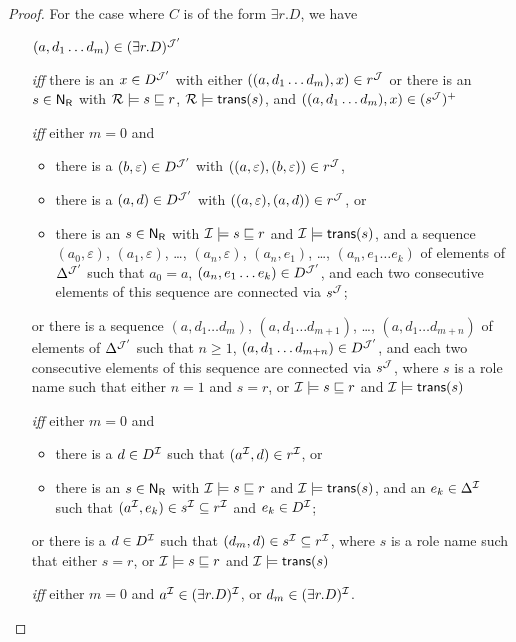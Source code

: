 \begin{proof}
    \noindent
    For the case where $C$ is of the form $\exists r.D$, we have
    \begin{itemize}
        \item[]
            $(a,d_1\dots d_m)\in(\exists r.D)^{\mathcal{J}'}$
        \item[\emph{iff}]
            there is an $x\in D^{\mathcal{J}'}$ with either $((a,d_1\dots d_m),x)\in
            r^\mathcal{J}$ or there is an $s\in\mathsf{N_R}$ with $\mathcal{R}\models s\sqsubseteq r$,
            $\mathcal{R}\models\mathsf{trans}(s)$, and $((a,d_1\dots d_m),x)\in (s^\mathcal{J})^+$
        \item[\emph{iff}]
            either $m=0$ and
            \begin{itemize}
                \item there is a $(b,\varepsilon)\in D^{\mathcal{J}'}$ with
                    $((a,\varepsilon),(b,\varepsilon))\in r^\mathcal{J}$,
                \item there is a $(a,d)\in D^{\mathcal{J}'}$ with
                    $((a,\varepsilon),(a,d))\in r^\mathcal{J}$, or
                \item there is an $s\in\mathsf{N_R}$ with $\mathcal{I}\models s\sqsubseteq r$
                    and $\mathcal{I}\models\mathsf{trans}(s)$, and a sequence
                    $(a_0,\varepsilon)$, $(a_1,\varepsilon)$, \dots,
                    $(a_n,\varepsilon)$, $(a_n,e_1)$, \dots, $(a_n,e_1\dots e_k)$
                    of elements of~$\Delta^{\mathcal{J}'}$ such that $a_0=a$,
                    $(a_n,e_1\dots e_k)\in D^{\mathcal{J}'}$, and each two consecutive
                    elements of this sequence are connected via $s^\mathcal{J}$;
            \end{itemize}
            or there is a sequence $(a,d_1\dots d_m)$, $(a,d_1\dots d_{m+1})$,
            \dots, $(a,d_1\dots d_{m+n})$ of elements of $\Delta^{\mathcal{J}'}$ such
            that $n\ge 1$, $(a,d_1\dots d_{m+n})\in D^{\mathcal{J}'}$, and each two
            consecutive elements of this sequence are connected via $s^\mathcal{J}$,
            where $s$ is a role name such that either $n=1$ and $s=r$, or
            $\mathcal{I}\models s\sqsubseteq r$ and $\mathcal{I}\models\mathsf{trans}(s)$
        \item[\emph{iff}]
            either $m=0$ and
            \begin{itemize}
                \item there is a $d\in D^\mathcal{I}$ such that $(a^\mathcal{I},d)\in r^\mathcal{I}$,
                    or
                \item there is an $s\in\mathsf{N_R}$ with $\mathcal{I}\models s\sqsubseteq r$
                    and $\mathcal{I}\models\mathsf{trans}(s)$, and an $e_k\in\Delta^\mathcal{I}$ such
                    that $(a^\mathcal{I},e_k)\in s^\mathcal{I}\subseteq r^\mathcal{I}$ and $e_k\in
                    D^\mathcal{I}$;
            \end{itemize}
            or there is a $d\in D^\mathcal{I}$ such that $(d_m,d)\in s^\mathcal{I}\subseteq
            r^\mathcal{I}$, where $s$ is a role name such that either $s=r$, or
            $\mathcal{I}\models s\sqsubseteq r$ and $\mathcal{I}\models\mathsf{trans}(s)$
        \item[\emph{iff}]
            either $m=0$ and $a^\mathcal{I}\in(\exists r.D)^\mathcal{I}$, or $d_m\in(\exists
            r.D)^\mathcal{I}$.
    \end{itemize}


\end{proof}
